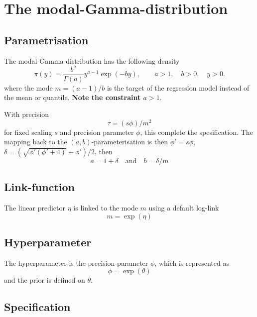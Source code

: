 \documentclass[a4paper,11pt]{article}
\begin{document}
\section*{The modal-Gamma-distribution}

\subsection*{Parametrisation}

The modal-Gamma-distribution has the following density
\begin{displaymath}
    \pi(y) = \frac{b^{a}}{\Gamma(a)} y^{a-1} \exp(-by), \qquad a>1,
    \quad b>0, \quad y >0.
\end{displaymath}
where the mode $m=(a-1)/b$ is the target of the regression model
instead of the mean or quantile. \textbf{Note the constraint $a>1$}.

With precision
\begin{displaymath}
    \tau = (s\phi) / m^{2}
\end{displaymath}
for fixed scaling $s$ and precision parameter $\phi$, this complete
the spesification. The mapping back to the $(a,b)$-parameterisation is
then $\phi'=s\phi$,
$\delta = \left(\sqrt{\phi'(\phi'+4)} + \phi'\right)/2$, then
\begin{displaymath}
    a = 1 + \delta \quad\text{and}\quad b=\delta / m
\end{displaymath}


\subsection*{Link-function}

The linear predictor $\eta$ is linked to the mode $m$ using a
default log-link
\begin{displaymath}
    m = \exp(\eta)
\end{displaymath}

\subsection*{Hyperparameter}

The hyperparameter is the precision parameter $\phi$, which is
represented as
\begin{displaymath}
    \phi = \exp(\theta)
\end{displaymath}
and the prior is defined on $\theta$.

\subsection*{Specification}
\end{document}
